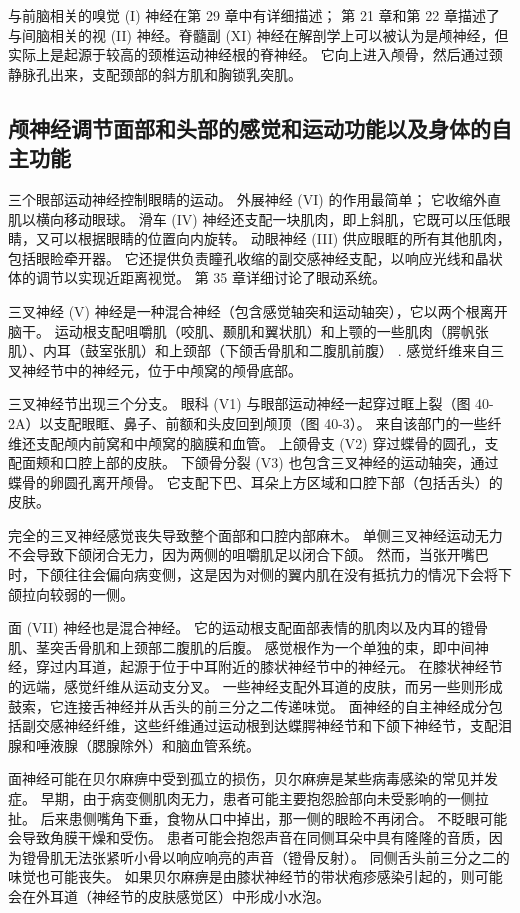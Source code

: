 与前脑相关的嗅觉 (I) 神经在第 29 章中有详细描述； 第 21 章和第 22 章描述了与间脑相关的视 (II) 神经。脊髓副 (XI) 神经在解剖学上可以被认为是颅神经，但实际上是起源于较高的颈椎运动神经根的脊神经。 它向上进入颅骨，然后通过颈静脉孔出来，支配颈部的斜方肌和胸锁乳突肌。

\subsection{颅神经调节面部和头部的感觉和运动功能以及身体的自主功能}

三个眼部运动神经控制眼睛的运动。 外展神经 (VI) 的作用最简单； 它收缩外直肌以横向移动眼球。 滑车 (IV) 神经还支配一块肌肉，即上斜肌，它既可以压低眼睛，又可以根据眼睛的位置向内旋转。 动眼神经 (III) 供应眼眶的所有其他肌肉，包括眼睑牵开器。 它还提供负责瞳孔收缩的副交感神经支配，以响应光线和晶状体的调节以实现近距离视觉。 第 35 章详细讨论了眼动系统。

三叉神经 (V) 神经是一种混合神经（包含感觉轴突和运动轴突），它以两个根离开脑干。 运动根支配咀嚼肌（咬肌、颞肌和翼状肌）和上颚的一些肌肉（腭帆张肌）、内耳（鼓室张肌）和上颈部（下颌舌骨肌和二腹肌前腹） . 感觉纤维来自三叉神经节中的神经元，位于中颅窝的颅骨底部。

三叉神经节出现三个分支。 眼科 (V1) 与眼部运动神经一起穿过眶上裂（图 40-2A）以支配眼眶、鼻子、前额和头皮回到颅顶（图 40-3）。 来自该部门的一些纤维还支配颅内前窝和中颅窝的脑膜和血管。 上颌骨支 (V2) 穿过蝶骨的圆孔，支配面颊和口腔上部的皮肤。 下颌骨分裂 (V3) 也包含三叉神经的运动轴突，通过蝶骨的卵圆孔离开颅骨。 它支配下巴、耳朵上方区域和口腔下部（包括舌头）的皮肤。

完全的三叉神经感觉丧失导致整个面部和口腔内部麻木。 单侧三叉神经运动无力不会导致下颌闭合无力，因为两侧的咀嚼肌足以闭合下颌。 然而，当张开嘴巴时，下颌往往会偏向病变侧，这是因为对侧的翼内肌在没有抵抗力的情况下会将下颌拉向较弱的一侧。

面 (VII) 神经也是混合神经。 它的运动根支配面部表情的肌肉以及内耳的镫骨肌、茎突舌骨肌和上颈部二腹肌的后腹。 感觉根作为一个单独的束，即中间神经，穿过内耳道，起源于位于中耳附近的膝状神经节中的神经元。 在膝状神经节的远端，感觉纤维从运动支分叉。 一些神经支配外耳道的皮肤，而另一些则形成鼓索，它连接舌神经并从舌头的前三分之二传递味觉。 面神经的自主神经成分包括副交感神经纤维，这些纤维通过运动根到达蝶腭神经节和下颌下神经节，支配泪腺和唾液腺（腮腺除外）和脑血管系统。

面神经可能在贝尔麻痹中受到孤立的损伤，贝尔麻痹是某些病毒感染的常见并发症。 早期，由于病变侧肌肉无力，患者可能主要抱怨脸部向未受影响的一侧拉扯。 后来患侧嘴角下垂，食物从口中掉出，那一侧的眼睑不再闭合。 不眨眼可能会导致角膜干燥和受伤。 患者可能会抱怨声音在同侧耳朵中具有隆隆的音质，因为镫骨肌无法张紧听小骨以响应响亮的声音（镫骨反射）。 同侧舌头前三分之二的味觉也可能丧失。 如果贝尔麻痹是由膝状神经节的带状疱疹感染引起的，则可能会在外耳道（神经节的皮肤感觉区）中形成小水泡。

